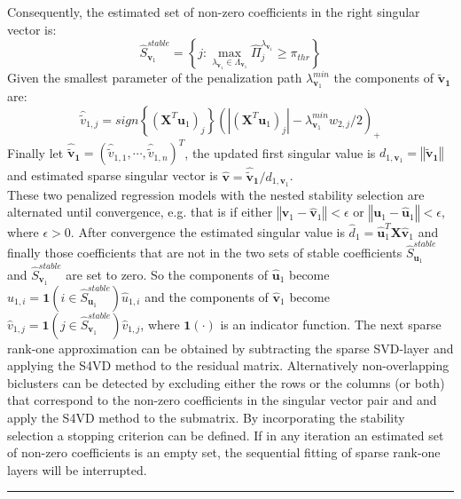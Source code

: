 Consequently, the estimated set of non-zero coefficients in the right singular vector is:
\begin{equation}
\hat{S}_{\mathbf{v}_{1}}^{stable}=\left\{j: \max_{\lambda_{\mathbf{v}_{1}} \in \Lambda_{\mathbf{v}_{1}}}\hat{\Pi}_{j}^{\lambda_{\mathbf{v}_{1}}} \geq \pi_{thr} \right\}
\end{equation}
Given the smallest parameter of the penalization path $\lambda^{min}_{\mathbf{v}_{1}}$ the components of $\mathbf{\tilde{v}_{1}}$ are:
\begin{equation}
     \hat{\tilde{v}}_{1,j}= \textit{sign}\left\{(\mathbf{X}^{T}\mathbf{u}_{1})_{j}\right\}(|(\mathbf{X}^{T}\mathbf{u}_{1})_{j}|-\lambda^{min}_{\mathbf{v}_{1}}w_{2,j}/2)_{+}
\end{equation}
Finally let $\mathbf{\hat{\tilde{v}}_{1}}=(\hat{\tilde{v}}_{1,1},\cdots,\hat{\tilde{v}}_{1,n})^{T}$, the updated first singular value is $d_{1,\mathbf{v}_{1}}=\left\Vert\mathbf{\tilde{v}_{1}}\right\Vert$ and estimated sparse singular vector is $\mathbf{\hat{v}}=\mathbf{\hat{\tilde{v}}_{1}}/d_{1,\mathbf{v}_{1}}$. \\
These two penalized regression models with the nested stability selection are alternated until convergence, e.g. that is if either $\left\Vert \mathbf{v}_{1} - \mathbf{\hat{v}}_{1}\right\Vert < \epsilon$ or $\left\Vert \mathbf{u}_{1} - \mathbf{\hat{u}}_{1} \right\Vert < \epsilon$, where $\epsilon > 0$.
After convergence the estimated singular value is $\hat{d}_{1}=\mathbf{\hat{u}}_{1}^{T}\mathbf{X}\mathbf{\hat{v}}_{1}$ and finally those coefficients that are not in the two sets of stable coefficients $\hat{S}_{\mathbf{u}_{1}}^{stable}$ and $\hat{S}_{\mathbf{v}_{1}}^{stable}$ are set to zero. So the components of $\hat{\mathbf{u}}_{1}$ become $\hat{u}_{1,i}=\mathbf{1}(i \in \hat{S}_{\mathbf{u}_{1}}^{stable})\hat{u}_{1,i}$ and the components of $\hat{\mathbf{v}}_{1}$ become $\hat{v}_{1,j}=\mathbf{1}(j \in \hat{S}_{\mathbf{v}_{1}}^{stable}  )\hat{v}_{1,j}$, where $\mathbf{1}(\cdot)$ is an indicator function.
The next sparse rank-one approximation can be obtained by subtracting the sparse SVD-layer and applying the S4VD method to the residual matrix. Alternatively non-overlapping biclusters can be detected by excluding either the rows or the columns (or both) that correspond to the non-zero coefficients in the singular vector pair and and apply the S4VD method to the submatrix. By incorporating the stability selection a stopping criterion can be defined. If in any iteration an estimated set of non-zero coefficients is an empty set, the sequential fitting of sparse rank-one layers will be interrupted.
\newpage
\hspace{-0.1cm} 
\rule{14.75 cm}{1pt}

